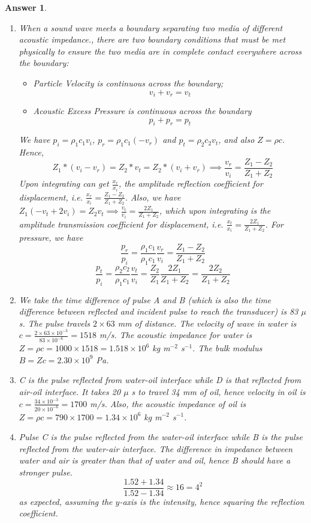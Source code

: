 \documentclass[a4paper]{article}
\newtheorem{ans}{Answer}[section]
\theoremstyle{new}
\begin{document}
\newpage
\begin{ans}\leavevmode
\begin{enumerate}[label=(\alph*)]
\item When a sound wave meets a boundary separating two media of different acoustic impedance., there are two boundary conditions that must be met physically to ensure the two media are in complete contact everywhere across the boundary:
\begin{itemize}
    \item Particle Velocity is continuous across the boundary;
    $$v_i+v_r=v_t$$
    \item Acoustic Excess Pressure is continuous across the boundary
    $$p_i+p_r=p_t$$
\end{itemize}
We have $p_i=\rho_1c_1v_i$, $p_r=\rho_1c_1(-v_r)$ and $p_t=\rho_2c_2v_t$, and also $Z=\rho c$. Hence, 
$$Z_1*(v_i-v_r)=Z_2*v_t=Z_2*(v_i+v_r)\implies\frac{v_r}{v_i}=\frac{Z_1-Z_2}{Z_1+Z_2}$$
Upon integrating can get $\frac{x_r}{x_i}$, the amplitude reflection coefficient for displacement, i.e. $\frac{x_r}{x_i}=\frac{Z_1-Z_2}{Z_1+Z_2}$. Also, we have $Z_1(-v_t+2v_i)=Z_2v_t\implies\frac{v_t}{v_i}=\frac{2Z_1}{Z_1+Z_2}$, which upon integrating is the amplitude transmission coefficient for displacement, i.e. $\frac{x_t}{x_i}=\frac{2Z_1}{Z_1+Z_2}$. For pressure, we have
$$\frac{p_r}{p_i}=\frac{\rho_1c_1}{\rho_1c_1}\frac{v_r}{v_i}=\frac{Z_1-Z_2}{Z_1+Z_2}$$
$$\frac{p_t}{p_i}=\frac{\rho_2c_2}{\rho_1c_1}\frac{v_t}{v_i}=\frac{Z_2}{Z_1}\frac{2Z_1}{Z_1+Z_2}=\frac{2Z_2}{Z_1+Z_2}$$
\item We take the time difference of pulse A and B (which is also the time difference between reflected and incident pulse to reach the transducer) is 83 $\mu$s. The pulse travels $2\times 63$ mm of distance. The velocity of wave in water is $c=\frac{2\times 63\times10^{-3}}{83\times10^{-6}}=1518$ m/s. The acoustic impedance for water is $Z=\rho c=1000\times 1518=1.518\times10^6$ kg m$^{-2}$ s$^{-1}$. The bulk modulus $B=Zc=2.30\times10^9$ Pa.
\item C is the pulse reflected from water-oil interface while D is that reflected from air-oil interface. It takes 20 $\mu$ s to travel 34 mm of oil, hence velocity in oil is $c=\frac{34\times10^{-3}}{20\times10^{-6}}=1700$ m/s. Also, the acoustic impedance of oil is $Z=\rho c=790\times1700=1.34\times10^6$ kg m$^{-2}$ s$^{-1}$.
\item Pulse C is the pulse reflected from the water-oil interface while B is the pulse reflected from the water-air interface. The difference in impedance between water and air is greater than that of water and oil, hence B should have a stronger pulse. 
$$\frac{1.52+1.34}{1.52-1.34}\approx 16=4^2$$
as expected, assuming the $y$-axis is the intensity, hence squaring the reflection coefficient.
\end{enumerate}
\end{ans}
\end{document}
